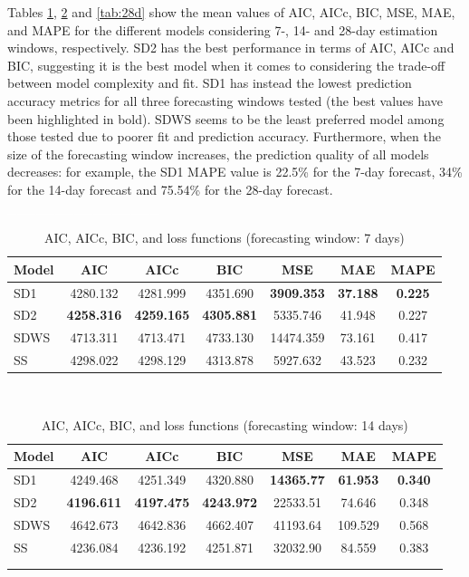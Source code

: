 Tables \ref{tab:7d}, \ref{tab:14d} and \ref{tab:28d} show the mean values of AIC, AICc, BIC, MSE, MAE, and MAPE for the different models considering 7-, 14- and 28-day estimation windows, respectively. SD2  has the best performance in terms of AIC, AICc and BIC, suggesting it is the best model when it comes to considering the trade-off between model complexity and fit. SD1 has instead the lowest prediction accuracy metrics for all three forecasting windows tested (the best values have been highlighted in bold). SDWS seems to be the least preferred model among those tested due to poorer fit and prediction accuracy. Furthermore, when the size of the forecasting window increases, the prediction quality of all models decreases: for example, the SD1 MAPE value is 22.5\% for the 7-day forecast, 34\% for the 14-day forecast and 75.54\% for the 28-day forecast. \\
\textcolor{white}{________________}

\begin{table}[h!]
\centering
\caption{AIC, AICc, BIC, and loss functions (forecasting window: 7 days)}
\centering
\renewcommand{\arraystretch}{1.5}
\begin{tabular}[h!]{l c c c c c c}
\hline
\textbf{Model} & \textbf{AIC} & \textbf{AICc} & \textbf{BIC} & \textbf{MSE} & \textbf{MAE} & \textbf{MAPE}\\
\hline
SD1 & 4280.132 & 4281.999 & 4351.690 & \textbf{3909.353} & \textbf{37.188} & \textbf{0.225}\\
SD2 & \textbf{4258.316} & \textbf{4259.165} & \textbf{4305.881} & 5335.746 & 41.948 & 0.227\\
SDWS & 4713.311 & 4713.471 & 4733.130 & 14474.359 & 73.161 & 0.417\\
SS & 4298.022 & 4298.129 & 4313.878 & 5927.632 & 43.523 & 0.232\\
\hline
\end{tabular}
\label{tab:7d}
\end{table}\\


\begin{table}[h!]
\centering
\caption{AIC, AICc, BIC, and loss functions (forecasting window: 14 days)}
\centering
\renewcommand{\arraystretch}{1.5}
\begin{tabular}[h!]{l c c c c c c}
\hline
\textbf{Model} & \textbf{AIC} & \textbf{AICc} & \textbf{BIC} & \textbf{MSE} & \textbf{MAE} & \textbf{MAPE}\\
\hline
SD1 & 4249.468 & 4251.349 & 4320.880 & \textbf{14365.77} & \textbf{61.953} & \textbf{0.340}\\
SD2 & \textbf{4196.611} & \textbf{4197.475} & \textbf{4243.972} & 22533.51 & 74.646 & 0.348\\
SDWS & 4642.673 & 4642.836 & 4662.407 & 41193.64 & 109.529 & 0.568\\
SS & 4236.084 & 4236.192 & 4251.871 & 32032.90 & 84.559 & 0.383\\
\hline \\
& & & & & & \\
\end{tabular}
\label{tab:14d}
\end{table} \\

